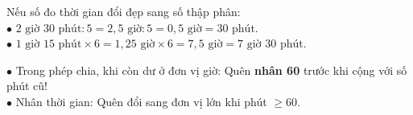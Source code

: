 \documentclass[14pt,a4paper,oneside]{extbook}
\begin{document}
\vspace{3mm}

\noindent
\begin{minipage}[t]{0.54\textwidth}
  \begin{tcolorbox}[
    enhanced,
    title={\footnotesize\bfseries\color{white}\faBolt\ Cách đổi ra phân số hoặc số thập phân rồi chia},
    colback=green!3!white,
    colframe=green!60!black,
    arc=2.5mm, boxrule=0.8pt, top=1.8mm, bottom=1.8mm, left=2.2mm, right=2.2mm
  ]
    \footnotesize
    Nếu số đo thời gian đổi đẹp sang số thập phân:\\
    $\bullet$ $2\text{ giờ } 30\text{ phút} : 5 = 2,5\text{ giờ} : 5 = 0,5\text{ giờ} = 30\text{ phút}$.\\
    $\bullet$ $1\text{ giờ } 15\text{ phút} \times 6 = 1,25\text{ giờ} \times 6 = 7,5\text{ giờ} = 7\text{ giờ } 30\text{ phút}$.
  \end{tcolorbox}
\end{minipage}%
\hfill
\begin{minipage}[t]{0.44\textwidth}
  \begin{tcolorbox}[
    enhanced,
    title={\footnotesize\bfseries\color{white}\faExclamationTriangle\ Mẹo tránh bẫy trắc nghiệm},
    colback=red!2!white,
    colframe=red!70!black,
    arc=2.5mm, boxrule=0.8pt, top=1.8mm, bottom=1.8mm, left=2.2mm, right=2.2mm
  ]
    \footnotesize
    $\bullet$ Trong phép chia, khi còn dư ở đơn vị giờ: Quên \textbf{nhân 60} trước khi cộng với số phút cũ!\\
    $\bullet$ Nhân thời gian: Quên đổi sang đơn vị lớn khi phút $\ge 60$.
  \end{tcolorbox}
\end{minipage}
\end{document}
